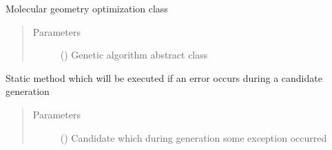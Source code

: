 \documentclass[letterpaper,10pt,english]{sphinxmanual}
\begin{document}
\begin{fulllineitems}
\sphinxAtStartPar
Molecular geometry optimization class
\begin{quote}\begin{description}
\item[{Parameters}] \leavevmode
\sphinxAtStartPar
{} () \textendash{} Genetic algorithm abstract class

\end{description}\end{quote}

\begin{fulllineitems}
\label{\detokenize{MolOpt:MolOpt.MolOpt.MolOpt.catch}}
\sphinxAtStartPar
Static method which will be executed if an error occurs during a candidate generation
\begin{quote}\begin{description}
\item[{Parameters}] \leavevmode
\sphinxAtStartPar
{} ({\hyperref[\detokenize{MolOpt.genetic:MolOpt.genetic.genetic.Chromosome}]{}}) \textendash{} Candidate which during generation some exception occurred

\end{description}\end{quote}

\end{fulllineitems}



\end{fulllineitems}
\end{document}
